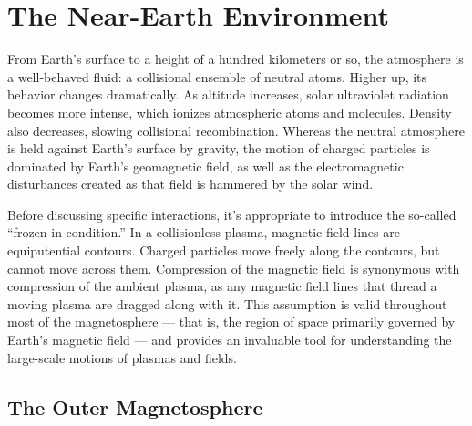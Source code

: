 


\chapter{The Near-Earth Environment}
  \label{ch_environment}


From Earth's surface to a height of a hundred kilometers or so, the atmosphere
is a well-behaved fluid: a collisional ensemble of neutral atoms. Higher up,
its behavior changes dramatically. As altitude increases, solar ultraviolet
radiation becomes more intense, which ionizes atmospheric atoms and molecules.
Density also decreases, slowing collisional recombination. Whereas the neutral
atmosphere is held against Earth's surface by gravity, the motion of charged
particles is dominated by Earth's geomagnetic field, as well as the
electromagnetic disturbances created as that field is hammered by the solar
wind. 

Before discussing specific interactions, it's appropriate to introduce the
so-called ``frozen-in condition.'' In a collisionless plasma, magnetic field
lines are equiputential contours. Charged particles move freely along the
contours, but cannot move across them. Compression of the magnetic field is
synonymous with compression of the ambient plasma, as any magnetic field lines
that thread a moving plasma are dragged along with it. This assumption is valid
throughout most of the magnetosphere --- that is, the region of space primarily
governed by Earth's magnetic field --- and provides an invaluable tool for
understanding the large-scale motions of plasmas and fields. 


\section{The Outer Magnetosphere}
  \label{sec_outer}

